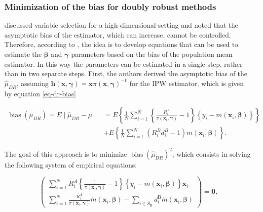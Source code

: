 \documentclass[
]{jss}
\begin{document}
\subsubsection{Minimization of the bias for doubly robust
methods}\label{minimization-of-the-bias-for-doubly-robust-methods}

\citet{yang_doubly_2020} discussed variable selection for a
high-dimensional setting and noted that the asymptotic bias of the
estimator, which can increase, cannot be controlled. Therefore,
according to \citet{yang_doubly_2020}, the idea is to develop equations
that can be used to estimate the \(\boldsymbol{\beta}\) and
\(\boldsymbol{\gamma}\) parameters based on the bias of the population
mean estimator. In this way the parameters can be estimated in a single
step, rather than in two separate steps. First, the authors derived the
asymptotic bias of the \(\hat{\mu}_{DR}\), assuming
\(\boldsymbol{h}(\boldsymbol{x}, \boldsymbol{\gamma})=\boldsymbol{x}\pi(\boldsymbol{x}, \boldsymbol{\gamma})^{-1}\)
for the IPW estimator, which is given by equation \eqref{eq-dr-bias}

\begin{equation}
\begin{aligned}
\operatorname{bias}\left(\hat{\mu}_{D R}\right) = E\mid\hat{\mu}_{DR}-\mu\mid &=
E\left\{\frac{1}{N} \sum_{i=1}^N\left\{\frac{R_i^A}{\pi\left(\boldsymbol{x}_i, \boldsymbol{\gamma}\right)} - 1\right\}\left\{y_i-m\left(\boldsymbol{x}_i, \boldsymbol{\beta}\right)\right\} \right\}\\
& + E\left\{\frac{1}{N} \sum_{i=1}^N\left(R_i^B d_i^B-1\right) m\left(\boldsymbol{x}_i, \boldsymbol{\beta}\right)\right\}.
\end{aligned}
\label{eq-dr-bias}
\end{equation}

The goal of this approach is to minimize
\(\operatorname{bias}\left(\hat{\mu}_{D R}\right)^2\), which consists in
solving the following system of empirical equations:

\begin{equation}
\left(\begin{array}{c}
\sum_{i=1}^N R_i^A\left\{\frac{1}{\pi\left(\boldsymbol{x}_i, \boldsymbol{\gamma}\right)}-1\right\}\left\{y_i-m\left(\boldsymbol{x}_i, \boldsymbol{\beta}\right)\right\} \boldsymbol{x}_i \\
\sum_{i=1}^N \frac{R_i^A}{\pi\left(\boldsymbol{x}_i, \boldsymbol{\gamma}\right)} \dot{m}\left(\boldsymbol{x}_i, \boldsymbol{\beta}\right) -\sum_{i \in S_{\mathrm{B}}} d_i^{\mathrm{B}} \dot{m}\left(\boldsymbol{x}_i, \boldsymbol{\beta}\right)
\end{array}\right) = \boldsymbol{0},
\label{eq-bias-min}
\end{equation}
\end{document}
